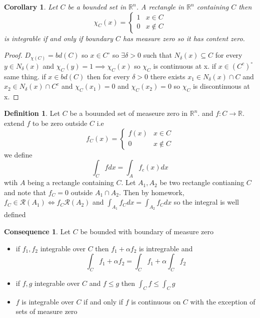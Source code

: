 \documentclass[11pt,openany]{book}
\theoremstyle{plain}
\newtheorem{corollary}{Corollary}[chapter]
\theoremstyle{definition}
\newtheorem{definition}{Definition}[chapter]
\newtheorem{consequence}{Consequence}[chapter]
\theoremstyle{remark}
\newcommand{\R}{\mathbb{R}}
\begin{document}
\begin{corollary}
    Let $C$ be a bounded set in $\R^n$. A rectangle in $\R^n$ containing $C$ then \[\chi_C(x) = \begin{cases}
        1 & x \in C\\
        0 & x \notin C
    \end{cases}\] is integrable if and only if boundary $C$ has measure zero so it has content zero.
\end{corollary}
\begin{proof}
    $D_{\chi(C)} = bd(C)$ so $x \in C^\circ$ so $\exists \delta >0$ such that $N_\delta(x) \subseteq C$ for every $y \in N_\delta(x)$ and $\chi_C(y) = 1 \implies \chi_C(x)$ so $\chi_C$ is continuous at x. if $x \in (C^c)^\circ$ same thing. if $x \in bd(C)$ then for every $\delta >0$ there exists $x_1 \in N_\delta(x) \cap C$ and $x_2 \in N_\delta(x) \cap C^c$ and $\chi_C(x_1) = 0$ and $\chi_C(x_2) = 0$ so $\chi_C$ is discontinuous at x. 
\end{proof}

\begin{definition}
    Let $C$ be a bouunded set of measeure zero in $\R^n$. and $ f:C \to \R$. extend $f$ to be zero outside $C$ i.e \[f_C(x) = \begin{cases}
        f(x) & x \in C\\
        0 & x \notin C
    \end{cases}\] we define \[\int_C fdx = \int_A f_c(x)dx\] wtih $A$ being a rectangle containing $C$. Let $A_1, A_2$ be two rectangle contianing $C$ and note that $f_C = 0$ outside $A_1 \cap A_2$. Then by homework, $f_C\in \mathcal{R}(A_1) \iff f_C \mathcal{R}(A_2)$ and $\int_{A_1} f_C dx = \int_{A_2} f_C dx$ so the integral is well defined
\end{definition}

\begin{consequence}
    Let $C$ be bounded with boundary of measure zero \begin{itemize}
        \item if $f_1,f_2$ integrable over $C$ then $f_1 + \alpha f_2$ is intregrable and \[\int_C f_1+ \alpha f_2 = \int_C f_1 + \alpha \int_C f_2\]
        \item if $f,g$ integrable over $C$ and $f \le g$ then $\int_C f \le \int_C g$
        \item  $f$ is integrable over $C$ if and only if $f$ is continuous on $C$ with the exception of sets of measure zero
    \end{itemize}
\end{consequence}
\end{document}
